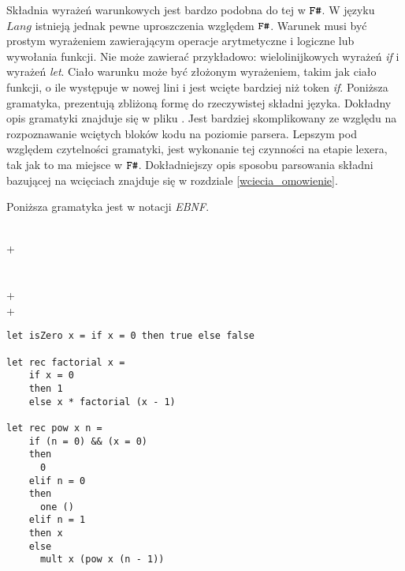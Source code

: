 \documentclass[declaration,shortabstract]{iithesis}
\begin{document}
Składnia wyrażeń warunkowych jest bardzo podobna do tej w $\verb!F#!$. W 
języku $Lang$
istnieją jednak pewne uproszczenia względem $\verb!F#!$. 
Warunek musi być prostym wyrażeniem zawierającym operacje arytmetyczne i 
logiczne
lub wywołania funkcji. Nie może zawierać przykładowo: wielolinijkowych wyrażeń
\textit{if} i wyrażeń \textit{let}. Ciało warunku może być złożonym wyrażeniem, takim jak 
ciało funkcji, o ile występuje w nowej lini i jest wcięte bardziej niż 
token \textit{if}. 
Poniższa gramatyka, prezentują zbliżoną formę do rzeczywistej składni języka.
Dokładny opis gramatyki znajduje się w pliku 
. Jest bardziej skomplikowany
ze względu na rozpoznawanie wciętych bloków kodu na
poziomie parsera. Lepszym pod względem czytelności gramatyki, 
jest wykonanie tej czynności na etapie lexera, tak jak to ma miejsce w $\verb!F#!$. Dokładniejszy opis 
sposobu parsowania składni bazującej na wcięciach znajduje się w rozdziale \ref{wciecia_omowienie}. 

Poniższa gramatyka jest w notacji \textit{EBNF}.

\begin{bnf*}
    {     
       
    }\\
    {     
      + \ast {}
    }\\
    {  \bnfor \bnfes}\\
    {    \bnfor \bnfes}\\
    { + \bnfor {} 
     \bnfor \bnfes}\\
    { + \bnfor {} 
     \bnfor \bnfes}\\
    {}
\end{bnf*}

\begin{lstlisting}[frame=single, caption=Przykłady wyrażeń warunkowych.]
let isZero x = if x = 0 then true else false

let rec factorial x = 
    if x = 0 
    then 1 
    else x * factorial (x - 1)

let rec pow x n = 
    if (n = 0) && (x = 0)
    then 
      0 
    elif n = 0 
    then 
      one ()
    elif n = 1 
    then x
    else 
      mult x (pow x (n - 1))
\end{lstlisting}
\end{document}
